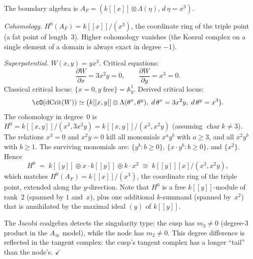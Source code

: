 \begin{computation}[Cusp: $F(x) = x^3$]
\label{comp:lg-cusp}
The boundary algebra is
$A_F = (k[[x]] \otimes \Lambda(\eta),\, d\,\eta = x^3)$.

\emph{Cohomology.}
$H^0(A_F) = k[[x]]/(x^3)$, the coordinate ring of the triple point
(a fat point of length~$3$). Higher cohomology vanishes (the Koszul
complex on a single element of a domain is always exact in degree
$-1$).

\emph{Superpotential.} $W(x,y) = yx^3$. Critical equations:
\[
\frac{\partial W}{\partial x} = 3x^2 y = 0, \qquad
\frac{\partial W}{\partial y} = x^3 = 0.
\]
Classical critical locus: $\{x = 0, y\;\text{free}\} = \mathbb{A}^1_y$.
Derived critical locus:
\[
\cO(\operatorname{dCrit}(W))
\simeq
\bigl(k[[x,y]] \otimes \Lambda(\theta^x, \theta^y),\;
d\,\theta^x = 3x^2 y,\; d\,\theta^y = x^3\bigr).
\]
The cohomology in degree~$0$ is
$H^0 = k[[x,y]]/(x^3, 3x^2 y) = k[[x,y]]/(x^3, x^2 y)$
(assuming $\operatorname{char} k \neq 3$).
The relations $x^3 = 0$ and $x^2 y = 0$ kill all monomials
$x^a y^b$ with $a \geq 3$, and all $x^2 y^b$ with $b \geq 1$.
The surviving monomials are:
$\{y^b : b \geq 0\}$, $\{x \cdot y^b : b \geq 0\}$, and $\{x^2\}$.
Hence
\[
H^0 \;=\; k[[y]] \oplus x \cdot k[[y]] \oplus k \cdot x^2
\;\cong\; k[[y]][x]/(x^3, x^2 y),
\]
which matches $H^0(A_F) = k[[x]]/(x^3)$, the coordinate ring of
the triple point, extended along the $y$-direction.
Note that $H^0$ is a free $k[[y]]$-module of rank~$2$
(spanned by $1$ and~$x$), plus one additional $k$-summand
(spanned by~$x^2$) that is annihilated by the maximal
ideal $(y)$ of $k[[y]]$.

The Jacobi coalgebra detects the singularity type: the cusp has
$m_3 \neq 0$ (degree-$3$ product in the $A_\infty$ model), while
the node has $m_2 \neq 0$. This degree difference is reflected
in the tangent complex: the cusp's tangent complex has a longer
``tail'' than the node's.
\hfill$\checkmark$
\end{computation}

